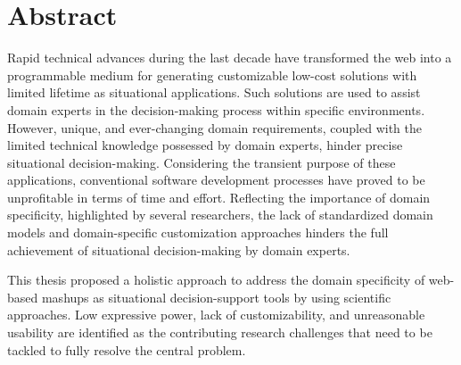 %
\chapter*{Abstract}
\label{chp:abstract}

Rapid technical advances during the last decade have transformed the web into a programmable medium for generating customizable low-cost solutions with limited lifetime as situational applications. Such solutions are used to assist domain experts in the decision-making process within specific environments. However, unique, and ever-changing domain requirements, coupled with the limited technical knowledge possessed by domain experts, hinder precise situational decision-making. Considering the transient purpose of these applications, conventional software development processes have proved to be unprofitable in terms of time and effort. Reflecting the importance of domain specificity, highlighted by several researchers, the lack of standardized domain models and domain-specific customization approaches hinders the full achievement of situational decision-making by domain experts.

This thesis proposed a holistic approach to address the domain specificity of web-based mashups as situational decision-support tools by using scientific approaches. Low expressive power, lack of customizability, and unreasonable usability are identified as the contributing research challenges that need to be tackled to fully resolve the central problem.




\cleardoublepage